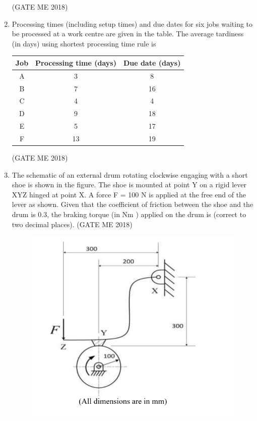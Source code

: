 \documentclass[journal]{IEEEtran}
\numberwithin{equation}{enumi}
\numberwithin{figure}{enumi}
\begin{document}
\begin{enumerate}
    \hfill{(GATE ME 2018)}
 \item Processing times (including setup times) and due dates for six jobs waiting to be processed at a work centre are given in the table. The average tardiness (in days) using shortest processing time rule is 
    
\begin{center}
\begin{tabular}{|c|c|c|}
    \hline
    \textbf{Job} & \textbf{Processing time (days)} & \textbf{Due date (days)} \\
    \hline
    A & 3 & 8 \\
    B & 7 & 16 \\
    C & 4 & 4 \\
    D & 9 & 18 \\
    E & 5 & 17 \\
    F & 13 & 19 \\
    \hline
\end{tabular}
\end{center}
\hfill{(GATE ME 2018)}
\item The schematic of an external drum rotating clockwise engaging with a short shoe is shown
in the figure. The shoe is mounted at point Y on a rigid lever XYZ hinged at point X. A force
F = 100 N is applied at the free end of the lever as shown. Given that the coefficient of
friction between the shoe and the drum is 0.3, the braking torque (in Nm ) applied on the drum is 
(correct to two decimal places).
\hfill{(GATE ME 2018)}
\begin{figure}[H]
\centering
    \includegraphics[width = 0.6\columnwidth]{figs/fig3.18.png}
    \caption*{}
    \label{fig:Q53}
    \end{figure}


\end{enumerate}
\end{document}
